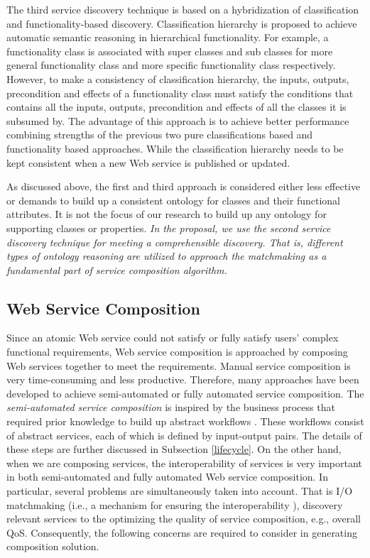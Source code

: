 The third service discovery technique is based on a hybridization of classification and functionality-based discovery. Classification hierarchy is proposed to achieve automatic semantic reasoning in hierarchical functionality. For example, a functionality class is associated with super classes and sub classes for more general functionality class and more specific functionality class respectively. However, to make a consistency of classification hierarchy, the inputs, outputs, precondition and effects of a functionality class must satisfy the conditions that contains all the inputs, outputs, precondition and effects of all the classes it is subsumed by. The advantage of this approach is to achieve better performance combining strengths of the previous two pure classifications based and functionality based approaches. While the classification hierarchy needs to be kept consistent when a new Web service is published or updated.​

As discussed above, the first and third approach is considered either less effective or demands to build up a consistent ontology for classes and their functional attributes. It is not the focus of our research to build up any ontology for supporting classes or properties.  \emph{In the proposal, we use the second service discovery technique for meeting a comprehensible discovery. That is, different types of ontology reasoning are utilized to approach the matchmaking as a fundamental part of service composition algorithm.}



\subsection{Web Service Composition}\label{servicecomposition}

Since an atomic Web service could not satisfy or fully satisfy users' complex functional requirements, Web service composition is approached by composing Web services together to meet the requirements. Manual service composition is very time-consuming and less productive. Therefore, many approaches have been developed to achieve semi-automated or fully automated service composition. The \emph{semi-automated service composition} is inspired by the business process that required prior knowledge to build up abstract workflows \cite{moghaddam2014service}. These workflows consist of abstract services, each of which is defined by input-output pairs. The details of these steps are further discussed in Subsection \ref{lifecycle}. On the other hand, when we are composing services, the interoperability of services is very important in both semi-automated and fully automated Web service composition. In particular, several problems are simultaneously taken into account. That is I/O matchmaking (i.e., a mechanism for ensuring the interoperability ), discovery relevant services to the optimizing the quality of service composition, e.g., overall QoS. Consequently, the following concerns are required to consider in generating composition solution. 


